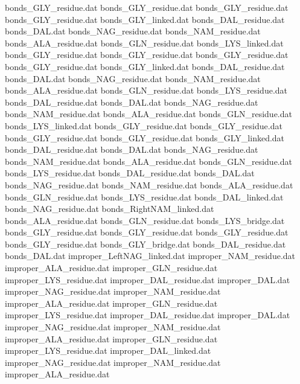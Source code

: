 bonds_GLY_residue.dat
bonds_GLY_residue.dat
bonds_GLY_residue.dat
bonds_GLY_residue.dat
bonds_GLY_linked.dat
bonds_DAL_residue.dat           
bonds_DAL.dat                   
bonds_NAG_residue.dat           
bonds_NAM_residue.dat           
bonds_ALA_residue.dat           
bonds_GLN_residue.dat           
bonds_LYS_linked.dat            
bonds_GLY_residue.dat
bonds_GLY_residue.dat
bonds_GLY_residue.dat
bonds_GLY_residue.dat
bonds_GLY_linked.dat
bonds_DAL_residue.dat           
bonds_DAL.dat                   
bonds_NAG_residue.dat           
bonds_NAM_residue.dat           
bonds_ALA_residue.dat           
bonds_GLN_residue.dat           
bonds_LYS_residue.dat           
bonds_DAL_residue.dat           
bonds_DAL.dat                   
bonds_NAG_residue.dat           
bonds_NAM_residue.dat           
bonds_ALA_residue.dat           
bonds_GLN_residue.dat           
bonds_LYS_linked.dat            
bonds_GLY_residue.dat
bonds_GLY_residue.dat
bonds_GLY_residue.dat
bonds_GLY_residue.dat
bonds_GLY_linked.dat
bonds_DAL_residue.dat           
bonds_DAL.dat                   
bonds_NAG_residue.dat           
bonds_NAM_residue.dat           
bonds_ALA_residue.dat           
bonds_GLN_residue.dat           
bonds_LYS_residue.dat           
bonds_DAL_residue.dat           
bonds_DAL.dat                   
bonds_NAG_residue.dat           
bonds_NAM_residue.dat           
bonds_ALA_residue.dat           
bonds_GLN_residue.dat           
bonds_LYS_residue.dat           
bonds_DAL_linked.dat            
bonds_NAG_residue.dat           
bonds_RightNAM_linked.dat       
bonds_ALA_residue.dat           
bonds_GLN_residue.dat           
bonds_LYS_bridge.dat            
bonds_GLY_residue.dat
bonds_GLY_residue.dat
bonds_GLY_residue.dat
bonds_GLY_residue.dat
bonds_GLY_bridge.dat
bonds_DAL_residue.dat           
bonds_DAL.dat                   
improper_LeftNAG_linked.dat     
improper_NAM_residue.dat        
improper_ALA_residue.dat        
improper_GLN_residue.dat        
improper_LYS_residue.dat        
improper_DAL_residue.dat        
improper_DAL.dat                
improper_NAG_residue.dat        
improper_NAM_residue.dat        
improper_ALA_residue.dat        
improper_GLN_residue.dat        
improper_LYS_residue.dat        
improper_DAL_residue.dat        
improper_DAL.dat                
improper_NAG_residue.dat        
improper_NAM_residue.dat        
improper_ALA_residue.dat        
improper_GLN_residue.dat        
improper_LYS_residue.dat        
improper_DAL_linked.dat         
improper_NAG_residue.dat        
improper_NAM_residue.dat        
improper_ALA_residue.dat        
